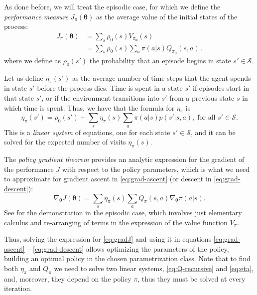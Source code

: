 As done before, we will treat the episodic case, for which we define the \emph{performance measure} $J_\pi(\boldsymbol \theta)$ as the average value of the initial states of the process:
\begin{equation}
    \begin{aligned}
        J_\pi (\boldsymbol \theta) 
        &= \sum_s \rho_0(s) V_{\pi_{\boldsymbol \theta}}(s) \\
        &= \sum_s \rho_0(s) \sum_a \pi(a|s) Q_{\pi_{\boldsymbol \theta}}(s, a) \, .
    \end{aligned}
    \label{eq:J}
\end{equation}
where we define as $\rho_0(s')$ the probability that an episode begins in state $s' \in \mathcal S$.

Let us define $\eta_\pi(s')$ as the average number of time steps that the agent spends in state $s'$ before the process dies. Time is spent in a state $s'$ if episodes start in that state $s'$, or if the environment transitions into $s'$ from a previous state $s$ in which time is spent. Thus, we have that the formula for $\eta_\pi$ is
\begin{equation}
    \eta_\pi(s') = \rho_0(s') + \sum_s \eta_\pi(s) \sum_a \pi(a|s) p(s'|s, a), \; \text{for all } s' \in \mathcal S.
    \label{eq:eta}
\end{equation}
This is a \textit{linear system} of equations, one for each state $s' \in \mathcal S$, and it can be solved for the expected number of visits $\eta_\pi(s)$.

The \emph{policy gradient theorem} provides an analytic expression for the gradient of the performance $J$ with respect to the policy parameters, which is what we need to approximate for gradient ascent in \eqref{eq:grad-ascent} (or descent in \eqref{eq:grad-descent}):
\begin{equation}
    \nabla_{\boldsymbol \theta} J(\boldsymbol \theta) = \sum_s \eta_\pi(s) \sum_a Q_\pi(s, a) \nabla_{\boldsymbol \theta} \pi(a|s).
    \label{eq:gradJ}
\end{equation}
See \cite{SuttonBarto} for the demonstration in the episodic case, which involves just elementary calculus and re-arranging of terms in the expression of the value function $V_\pi$.

Thus, solving the expression for \eqref{eq:gradJ} and using it in equations \eqref{eq:grad-ascent} -- \eqref{eq:grad-descent} allows optimizing the parameters of the policy, building an optimal policy in the chosen parametrization class. Note that to find both $\eta_\pi$ and $Q_\pi$ we need to solve two linear systems, \eqref{eq:Q-recursive} and \eqref{eq:eta}, and, moreover, they depend on the policy $\pi$, thus they must be solved at every iteration.


